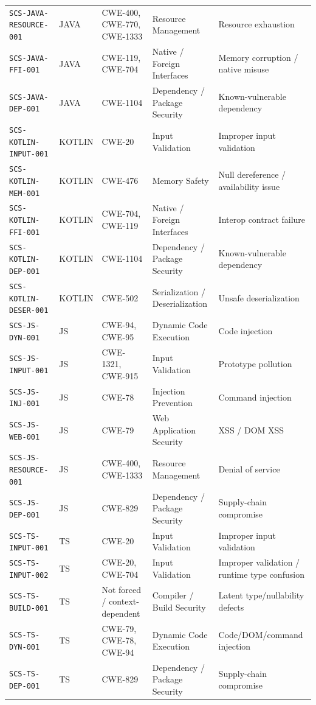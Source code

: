 \documentclass[10pt,letterpaper]{article}
\newcommand{\code}[1]{\begingroup\small\ttfamily\def\UrlFont{\ttfamily}\nolinkurl{#1}\endgroup}
\begin{document}
\begin{landscape}
\begin{longtable}{@{}P{1.3in}P{0.7in}P{1.4in}P{1.8in}P{3.8in}@{}}
\code{SCS-JAVA-RESOURCE-001} & JAVA & CWE-400, CWE-770, CWE-1333 & Resource Management & Resource exhaustion\\
\code{SCS-JAVA-FFI-001} & JAVA & CWE-119, CWE-704 & Native / Foreign Interfaces & Memory corruption / native misuse\\
\code{SCS-JAVA-DEP-001} & JAVA & CWE-1104 & Dependency / Package Security & Known-vulnerable dependency\\
\code{SCS-KOTLIN-INPUT-001} & KOTLIN & CWE-20 & Input Validation & Improper input validation\\
\code{SCS-KOTLIN-MEM-001} & KOTLIN & CWE-476 & Memory Safety & Null dereference / availability issue\\
\code{SCS-KOTLIN-FFI-001} & KOTLIN & CWE-704, CWE-119 & Native / Foreign Interfaces & Interop contract failure\\
\code{SCS-KOTLIN-DEP-001} & KOTLIN & CWE-1104 & Dependency / Package Security & Known-vulnerable dependency\\
\code{SCS-KOTLIN-DESER-001} & KOTLIN & CWE-502 & Serialization / Deserialization & Unsafe deserialization\\
\code{SCS-JS-DYN-001} & JS & CWE-94, CWE-95 & Dynamic Code Execution & Code injection\\
\code{SCS-JS-INPUT-001} & JS & CWE-1321, CWE-915 & Input Validation & Prototype pollution\\
\code{SCS-JS-INJ-001} & JS & CWE-78 & Injection Prevention & Command injection\\
\code{SCS-JS-WEB-001} & JS & CWE-79 & Web Application Security & XSS / DOM XSS\\
\code{SCS-JS-RESOURCE-001} & JS & CWE-400, CWE-1333 & Resource Management & Denial of service\\
\code{SCS-JS-DEP-001} & JS & CWE-829 & Dependency / Package Security & Supply-chain compromise\\
\code{SCS-TS-INPUT-001} & TS & CWE-20 & Input Validation & Improper input validation\\
\code{SCS-TS-INPUT-002} & TS & CWE-20, CWE-704 & Input Validation & Improper validation / runtime type confusion\\
\code{SCS-TS-BUILD-001} & TS & Not forced / context-dependent & Compiler / Build Security & Latent type/nullability defects\\
\code{SCS-TS-DYN-001} & TS & CWE-79, CWE-78, CWE-94 & Dynamic Code Execution & Code/DOM/command injection\\
\code{SCS-TS-DEP-001} & TS & CWE-829 & Dependency / Package Security & Supply-chain compromise\\

\end{longtable}
\end{landscape}
\end{document}
